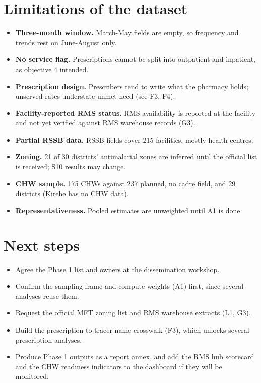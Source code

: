 \documentclass[10pt,a4paper]{article}
\begin{document}
\section{Limitations of the dataset}
\begin{itemize}\item \textbf{Three-month window.} March-May fields are empty, so frequency and trends rest on June-August only.
\item \textbf{No service flag.} Prescriptions cannot be split into outpatient and inpatient, as objective 4 intended.
\item \textbf{Prescription design.} Prescribers tend to write what the pharmacy holds; unserved rates understate unmet need (see F3, F4).
\item \textbf{Facility-reported RMS status.} RMS availability is reported at the facility and not yet verified against RMS warehouse records (G3).
\item \textbf{Partial RSSB data.} RSSB fields cover 215 facilities, mostly health centres.
\item \textbf{Zoning.} 21 of 30 districts' antimalarial zones are inferred until the official list is received; S10 results may change.
\item \textbf{CHW sample.} 175 CHWs against 237 planned, no cadre field, and 29 districts (Kirehe has no CHW data).
\item \textbf{Representativeness.} Pooled estimates are unweighted until A1 is done.
\end{itemize}
\section{Next steps}
\begin{itemize}\item Agree the Phase 1 list and owners at the dissemination workshop.
\item Confirm the sampling frame and compute weights (A1) first, since several analyses reuse them.
\item Request the official MFT zoning list and RMS warehouse extracts (L1, G3).
\item Build the prescription-to-tracer name crosswalk (F3), which unlocks several prescription analyses.
\item Produce Phase 1 outputs as a report annex, and add the RMS hub scorecard and the CHW readiness indicators to the dashboard if they will be monitored.
\end{itemize}
\end{document}
